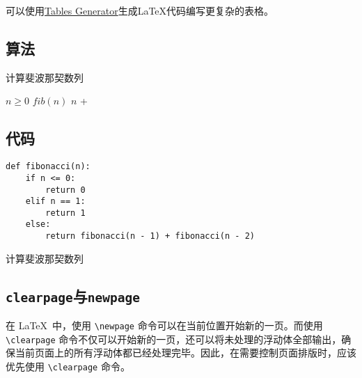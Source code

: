 可以使用\href{https://www.tablesgenerator.com}{Tables Generator}生成\LaTeX{}代码编写更复杂的表格。

\subsection{算法}

\begin{algorithm}
    \caption{计算斐波那契数列}
    \begin{algorithmic}[1]
        \Require $n \geq 0$
        \Ensure $fib(n)$
        \State \Return $n$
        \Else
        \State \Return {} + 
        \EndIf
        \EndFunction
    \end{algorithmic}
\end{algorithm}

\subsection{代码}

\begin{listing}[htbp]
    \begin{verbatim}
def fibonacci(n):
    if n <= 0:
        return 0
    elif n == 1:
        return 1
    else:
        return fibonacci(n - 1) + fibonacci(n - 2)
  \end{verbatim}
    \caption{计算斐波那契数列}
\end{listing}

\subsection{\texttt{clearpage}与\texttt{newpage}}

在 \LaTeX\ 中，使用 \verb|\newpage| 命令可以在当前位置开始新的一页。而使用 \verb|\clearpage| 命令不仅可以开始新的一页，还可以将未处理的浮动体全部输出，确保当前页面上的所有浮动体都已经处理完毕。因此，在需要控制页面排版时，应该优先使用 \verb|\clearpage| 命令。